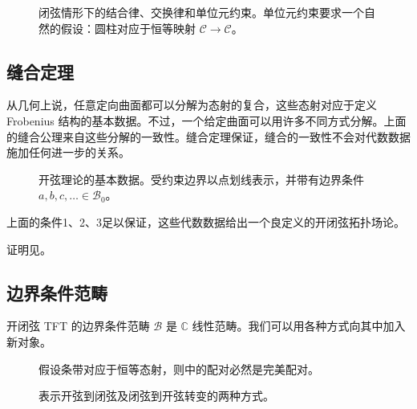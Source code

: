 \begin{figure}[H]
\centering
{}
\caption{闭弦情形下的结合律、交换律和单位元约束。单位元约束要求一个自然的假设：圆柱对应于恒等映射 $\mathcal{C}\to\mathcal{C}$。}\label{fig:2.3}
\end{figure}

\subsection{缝合定理}\label{sec:2.1.4}

从几何上说，任意定向曲面都可以分解为态射的复合，这些态射对应于定义 Frobenius 结构的基本数据。不过，一个给定曲面可以用许多不同方式分解。上面的缝合公理来自这些分解的一致性。缝合定理保证，缝合的一致性不会对代数数据施加任何进一步的关系。

\begin{figure}[H]
\centering
{}
\caption{开弦理论的基本数据。受约束边界以点划线表示，并带有边界条件 $a,b,c,\ldots\in\mathcal{B}_0$。}\label{fig:2.4}
\end{figure}

\begin{theorem}\label{thm:2.1}
上面的条件1、2、3足以保证，这些代数数据给出一个良定义的开闭弦拓扑场论。
\end{theorem}

证明见。

\subsection{边界条件范畴}\label{sec:2.1.5}

开闭弦 TFT 的边界条件范畴 $\mathcal{B}$ 是 $\mathbb{C}$ 线性范畴。我们可以用各种方式向其中加入新对象。

\begin{figure}[H]
\centering
{}
\caption{假设条带对应于恒等态射，则中的配对必然是完美配对。}\label{fig:2.5}
\end{figure}

\begin{figure}[H]
\centering
{}
\caption{表示开弦到闭弦及闭弦到开弦转变的两种方式。}\label{fig:2.6}
\end{figure}

